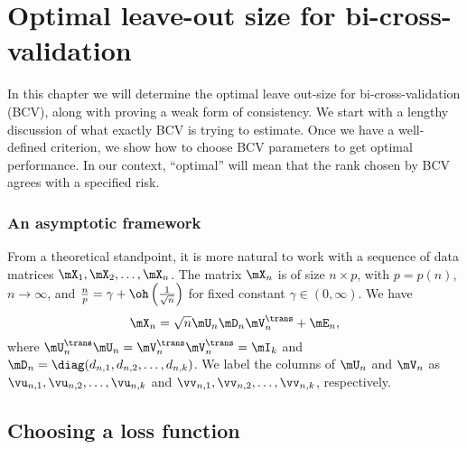 \chapter[Optimal leave-out size for BCV]{Optimal leave-out size for bi-cross-validation}

In this chapter we will determine the optimal leave out-size for bi-cross-validation (BCV), along with proving a weak form of consistency.  We start with a lengthy discussion of what exactly BCV is trying to estimate.  Once we have a well-defined criterion, we show how to choose BCV parameters to get optimal performance.  In our context, ``optimal'' will mean that the rank chosen by BCV agrees with a specified risk.

\subsection{An asymptotic framework}

From a theoretical standpoint, it is more natural to work with a sequence
of data matrices $\mX_1, \mX_2, \ldots, \mX_n$.  
The matrix $\mX_n$ is of size $n \times p$, with $p = p(n)$, $n \to \infty$,
and $\frac{n}{p} = \gamma + \oh\left( \frac{1}{\sqrt{n}} \right)$ for fixed
constant $\gamma \in (0, \infty)$.   We have
\begin{equation}
    \mX_n = \sqrt{n} \mU_n \mD_n \mV_n^\trans + \mE_n,
\end{equation}
where $\mU_n^\trans \mU_n = \mV_n^\trans \mV_n^\trans = \mI_k$ and
$\mD_n = \diag( d_{n,1}, d_{n,2}, \ldots, d_{n,k})$.  We label the columns
of $\mU_n$ and $\mV_n$ as $\vu_{n,1}, \vu_{n,2}, \ldots, \vu_{n,k}$ and
$\vv_{n,1}, \vv_{n,2}, \ldots, \vv_{n,k}$, respectively.


\section{Choosing a loss function}

